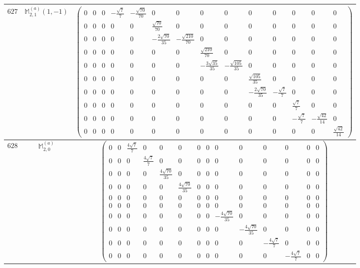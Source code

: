\documentclass[fleqn,8pt,landscape]{jsarticle}
\begin{document}
\begin{center}
\begin{longtable}{ccc}
$ 627 $ & $ \mathbb{M}_{2,1}^{(a)}(1,-1) $ & $ \begin{pmatrix} 0 & 0 & 0 & - \frac{\sqrt{7}}{7} & - \frac{\sqrt{70}}{70} & 0 & 0 & 0 & 0 & 0 & 0 & 0 & 0 & 0 \\ 0 & 0 & 0 & 0 & 0 & \frac{\sqrt{70}}{70} & 0 & 0 & 0 & 0 & 0 & 0 & 0 & 0 \\ 0 & 0 & 0 & 0 & 0 & - \frac{2 \sqrt{70}}{35} & - \frac{\sqrt{210}}{70} & 0 & 0 & 0 & 0 & 0 & 0 & 0 \\ 0 & 0 & 0 & 0 & 0 & 0 & 0 & \frac{\sqrt{210}}{70} & 0 & 0 & 0 & 0 & 0 & 0 \\ 0 & 0 & 0 & 0 & 0 & 0 & 0 & - \frac{3 \sqrt{35}}{35} & - \frac{\sqrt{105}}{35} & 0 & 0 & 0 & 0 & 0 \\ 0 & 0 & 0 & 0 & 0 & 0 & 0 & 0 & 0 & \frac{\sqrt{105}}{35} & 0 & 0 & 0 & 0 \\ 0 & 0 & 0 & 0 & 0 & 0 & 0 & 0 & 0 & - \frac{2 \sqrt{70}}{35} & - \frac{\sqrt{7}}{7} & 0 & 0 & 0 \\ 0 & 0 & 0 & 0 & 0 & 0 & 0 & 0 & 0 & 0 & 0 & \frac{\sqrt{7}}{7} & 0 & 0 \\ 0 & 0 & 0 & 0 & 0 & 0 & 0 & 0 & 0 & 0 & 0 & - \frac{\sqrt{7}}{7} & - \frac{\sqrt{42}}{14} & 0 \\ 0 & 0 & 0 & 0 & 0 & 0 & 0 & 0 & 0 & 0 & 0 & 0 & 0 & \frac{\sqrt{42}}{14} \end{pmatrix} $ \\ \hline
$ 628 $ & $ \mathbb{M}_{2,0}^{(a)} $ & $ \begin{pmatrix} 0 & 0 & \frac{4 \sqrt{7}}{7} & 0 & 0 & 0 & 0 & 0 & 0 & 0 & 0 & 0 & 0 & 0 \\ 0 & 0 & 0 & \frac{4 \sqrt{7}}{7} & 0 & 0 & 0 & 0 & 0 & 0 & 0 & 0 & 0 & 0 \\ 0 & 0 & 0 & 0 & \frac{4 \sqrt{70}}{35} & 0 & 0 & 0 & 0 & 0 & 0 & 0 & 0 & 0 \\ 0 & 0 & 0 & 0 & 0 & \frac{4 \sqrt{70}}{35} & 0 & 0 & 0 & 0 & 0 & 0 & 0 & 0 \\ 0 & 0 & 0 & 0 & 0 & 0 & 0 & 0 & 0 & 0 & 0 & 0 & 0 & 0 \\ 0 & 0 & 0 & 0 & 0 & 0 & 0 & 0 & 0 & 0 & 0 & 0 & 0 & 0 \\ 0 & 0 & 0 & 0 & 0 & 0 & 0 & 0 & - \frac{4 \sqrt{70}}{35} & 0 & 0 & 0 & 0 & 0 \\ 0 & 0 & 0 & 0 & 0 & 0 & 0 & 0 & 0 & - \frac{4 \sqrt{70}}{35} & 0 & 0 & 0 & 0 \\ 0 & 0 & 0 & 0 & 0 & 0 & 0 & 0 & 0 & 0 & - \frac{4 \sqrt{7}}{7} & 0 & 0 & 0 \\ 0 & 0 & 0 & 0 & 0 & 0 & 0 & 0 & 0 & 0 & 0 & - \frac{4 \sqrt{7}}{7} & 0 & 0 \end{pmatrix} $ \\ \hline

\end{longtable}
\end{center}
\end{document}
